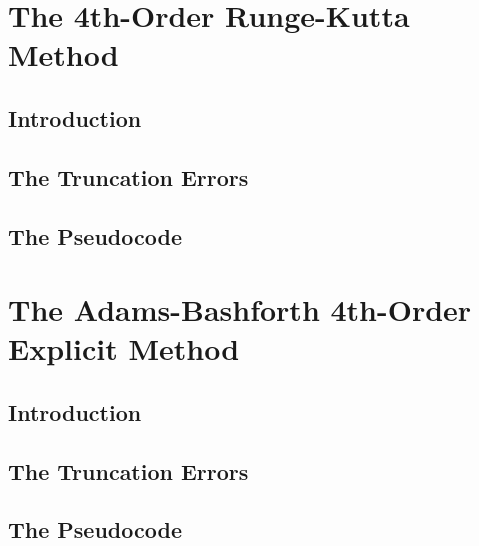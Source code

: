 \documentclass[12pt,oneside]{book}
\begin{document}
	\section{The 4th-Order Runge-Kutta Method} \label{m:rk4}
		\begin{spacing}{1.2}
			
			\subsection{Introduction}
			
			
			\subsection{The Truncation Errors}
			
			
			\subsection{The Pseudocode}
			
		\end{spacing}
		
		\clearpage
	\section{The Adams-Bashforth 4th-Order Explicit Method} \label{m:ab4e}
		\begin{spacing}{1.2}
			
			\subsection{Introduction}
			
			
			\subsection{The Truncation Errors}
			
			
			\subsection{The Pseudocode}
			
		\end{spacing}
		
		\clearpage
\end{document}
